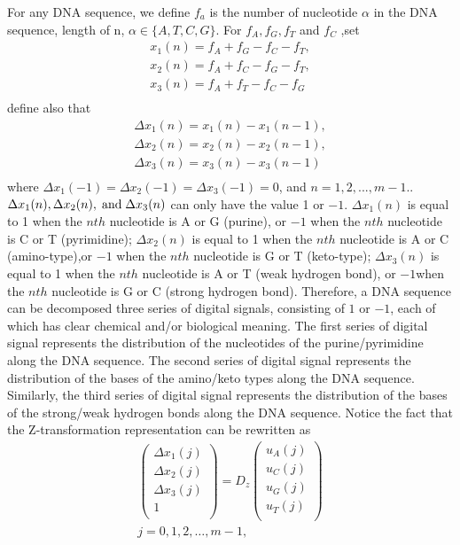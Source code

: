 \documentclass[preprint,authoryear,12pt]{elsarticle}
\begin{document}
For any DNA sequence, we define $f_{a}$  is the number of  nucleotide $\alpha$ in the DNA sequence, length of n, $\alpha  \in \{ A,T,C,G\} $. For $f_{A},f_{G},f_{T}$ and $f_{C}$ ,set\\
$$
\begin{array}{l}
 x_1 (n) = f_A  + f_G  - f_C  - f_T , \\
 x_2 (n) = f_A  + f_C  - f_G  - f_T , \\
 x_3 (n) = f_A  + f_T  - f_C  - f_G  \\
 \end{array}
 $$
 define also that\\
 $$
\begin{array}{l}
 \Delta x_1 (n) = x_1 (n) - x_1 (n - 1), \\
 \Delta x_2 (n) = x_2 (n) - x_2 (n - 1), \\
 \Delta x_3 (n) = x_3 (n) - x_3 (n - 1) \\
 \end{array}
$$
where $\Delta x_1 ( - 1) = \Delta x_2 ( - 1) = \Delta x_3 ( - 1) = 0$, and $n=1,2,...,m-1$..  $\Delta x_1 (n),\Delta x_2 (n),\;{\rm{and}}\;\Delta x_3 (n)$ can only have the value 1 or $- 1$.  $\Delta x_1 (n)$ is equal to 1 when the $nth$ nucleotide is A or G (purine), or $- 1$ when the  $nth$ nucleotide is C or T (pyrimidine); $\Delta x_2 (n)$ is equal to 1 when the $nth$ nucleotide is A or C (amino-type),or $- 1$ when the $nth$ nucleotide is G or T (keto-type); $\Delta x_3 (n)$  is equal to 1 when the $nth$ nucleotide is A or T (weak hydrogen bond), or $- 1$when the $nth$ nucleotide is G or C (strong hydrogen bond). Therefore, a DNA sequence can be decomposed three series of digital signals, consisting of $1$ or $- 1$, each of which has clear chemical and/or biological meaning. The first series of digital signal  represents the distribution of the nucleotides of the purine/pyrimidine along the DNA sequence. The second series of digital signal represents the distribution of the bases of the amino/keto types along the DNA sequence. Similarly, the third series of digital signal   represents the distribution of the bases of the strong/weak hydrogen bonds along the DNA sequence. Notice the fact that the Z-transformation representation \citep{ZHANG1998} can be rewritten as
$$\begin{array}{l}
 \left( \begin{array}{l}
 \Delta x_1 (j) \\
 \Delta x_2 (j) \\
 \Delta x_3 (j) \\
 1 \\
 \end{array} \right) = D_z \left( \begin{array}{l}
 u_A (j) \\
 u_C (j) \\
 u_G (j) \\
 u_T (j) \\
 \end{array} \right) \\
 j = 0,1,2, \ldots ,m - 1, \\
 \end{array}$$
\end{document}
